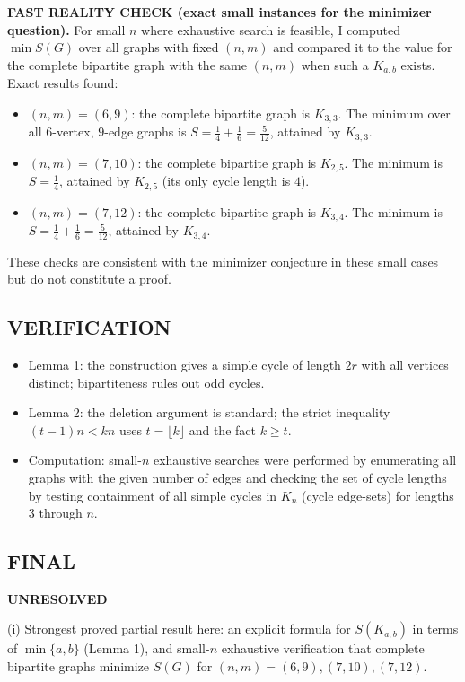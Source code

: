 \medskip
\textbf{FAST REALITY CHECK (exact small instances for the minimizer question).}
For small $n$ where exhaustive search is feasible, I computed $\min S(G)$ over all graphs with fixed $(n,m)$ and compared 
it to the value for the complete bipartite graph with the same $(n,m)$ when such a $K_{a,b}$ exists.
Exact results found:
\begin{itemize}
\item $(n,m)=(6,9)$: the complete bipartite graph is $K_{3,3}$. The minimum over all $6$-vertex, $9$-edge graphs is 
$S=\frac14+\frac16=\frac{5}{12}$, attained by $K_{3,3}$.
\item $(n,m)=(7,10)$: the complete bipartite graph is $K_{2,5}$. The minimum is $S=\frac14$, attained by $K_{2,5}$ 
(its only cycle length is $4$).
\item $(n,m)=(7,12)$: the complete bipartite graph is $K_{3,4}$. The minimum is $S=\frac14+\frac16=\frac{5}{12}$, 
attained by $K_{3,4}$.
\end{itemize}
These checks are consistent with the minimizer conjecture in these small cases but do not constitute a proof.

\subsection*{VERIFICATION}
\begin{itemize}
\item Lemma 1: the construction gives a simple cycle of length $2r$ with all vertices distinct; bipartiteness rules out odd 
cycles.
\item Lemma 2: the deletion argument is standard; the strict inequality $(t-1)n < kn$ uses $t=\lfloor k\rfloor$ and the 
fact $k\ge t$.
\item Computation: small-$n$ exhaustive searches were performed by enumerating all graphs with the given number of edges and 
checking the set of cycle lengths by testing containment of all simple cycles in $K_n$ (cycle edge-sets) for lengths 
$3$ through $n$.
\end{itemize}

\subsection*{FINAL}
\textbf{UNRESOLVED}

(i) Strongest proved partial result here: an explicit formula for $S(K_{a,b})$ in terms of $\min\{a,b\}$ (Lemma 1), and 
small-$n$ exhaustive verification that complete bipartite graphs minimize $S(G)$ for $(n,m)=(6,9),(7,10),(7,12)$.

